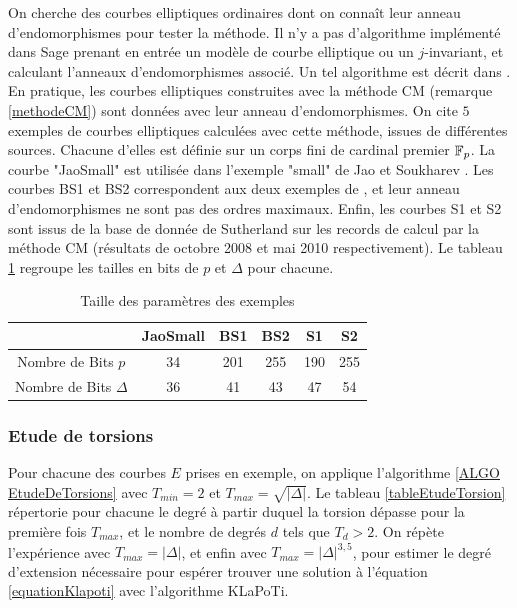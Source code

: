 On cherche des courbes elliptiques ordinaires dont on connaît leur anneau d'endomorphismes pour tester la méthode. Il n'y a pas d'algorithme implémenté dans Sage prenant en entrée un modèle de courbe elliptique ou un $j$-invariant, et calculant l'anneaux d'endomorphismes associé. Un tel algorithme est décrit dans \cite{BissonSutherland}. En pratique, les courbes elliptiques construites avec la méthode CM (remarque \ref{methodeCM}) sont données avec leur anneau d'endomorphismes. On cite $5$ exemples de courbes elliptiques calculées avec cette méthode, issues de différentes sources. Chacune d'elles est définie sur un corps fini de cardinal premier $\mathbb{F}_p$. La courbe "JaoSmall" est utilisée dans l'exemple "small" de Jao et Soukharev \cite{JaoSoukharev}. Les courbes BS1 et BS2 correspondent aux deux exemples de \cite{BissonSutherland}, et leur anneau d'endomorphismes ne sont pas des ordres maximaux. Enfin, les courbes S1 et S2 sont issus de la base de donnée de Sutherland sur les records de calcul par la méthode CM (résultats de octobre 2008 et mai 2010 respectivement). Le tableau \ref{tableCourbesExemples} regroupe les tailles en bits de $p$ et $\Delta$ pour chacune. 

\begin{table}[h]
	\begin{center}
		\begin{tabular}{|c|c|c|c|c|c|}
			\hline
			& JaoSmall & BS1 & BS2 & S1 & S2 \\
			\hline
			Nombre de Bits $p$ & 34 & 201 & 255 & 190 & 255 \\
			\hline
			Nombre de Bits $\Delta$ & 36 & 41 & 43 & 47 & 54 \\
			\hline
		\end{tabular}
	\end{center}
	\caption{Taille des paramètres des exemples}
	\label{tableCourbesExemples}
\end{table}

\subsubsection{Etude de torsions}

Pour chacune des courbes $E$ prises en exemple, on applique l'algorithme \ref{ALGO EtudeDeTorsions} avec $T_{min} = 2$ et $T_{max} = \sqrt{|\Delta|}$. Le tableau \ref{tableEtudeTorsion} répertorie pour chacune le degré à partir duquel la torsion dépasse pour la première fois $T_{max}$, et le nombre de degrés $d$ tels que $T_d > 2$. On répète l'expérience avec $T_{max} = |\Delta|$, et enfin avec  $T_{max} = |\Delta|^{3,5}$, pour estimer le degré d'extension nécessaire pour espérer trouver  une solution  à l'équation \eqref{equationKlapoti} avec l'algorithme KLaPoTi. 

